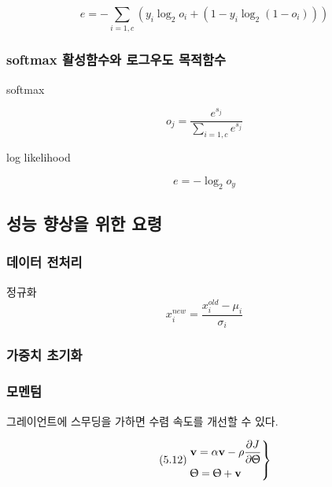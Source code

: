 \documentclass [12pt] {oblivoir}
\let\oldsubsubsection=\subsubsection
\renewcommand{\subsubsection}
{
  \filbreak
  \oldsubsubsection
}
\begin{document}
\begin{equation} \tag{5.6}
  e = -\sum_{i=1,c}(y_{i}\log_{2}o_{i} + (1 - y_{i}\log_{2}(1 - o_{i})))
\end{equation}

\subsubsection{softmax 활성함수와 로그우도 목적함수}

softmax

\begin{equation} \tag{5.7}
  o_{j}= \frac{e^{s_{j}}}{\sum_{i=1,c}e^{s_{j}}}
\end{equation}

log likelihood

\begin{equation} \tag{5.8}
  e = -\log_{2}o_{y}
\end{equation}

\subsection{성능 향상을 위한 요령}

\subsubsection{데이터 전처리}

정규화
\begin{equation} \tag{5.9}
  x_{i}^{new} = \frac{x_{i}^{old} - \mu_{i}}{\sigma_{i}}
\end{equation}

\subsubsection{가중치 초기화}

\subsubsection{모멘텀}

그레이언트에 스무딩을 가하면 수렴 속도를 개선할 수 있다.

\begin{equation} \tag{5.12}
  \begin{rcases}
    \mathbf{v} = \alpha\mathbf{v} - \rho\displaystyle\frac{\partial J}{\partial\Uptheta} \\
    \Uptheta = \Uptheta + \mathbf{v}
  \end{rcases}
\end{equation}
\end{document}
